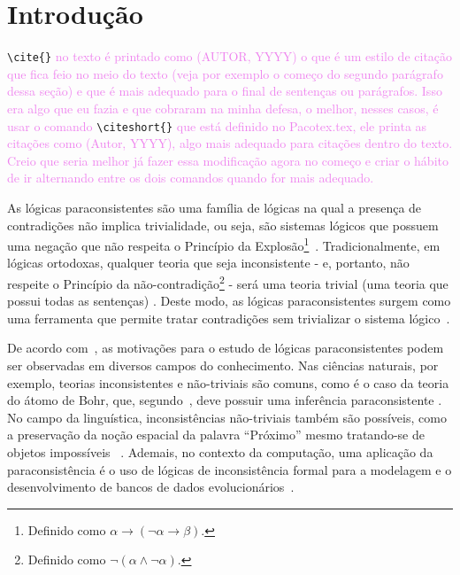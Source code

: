 \chapter{Introdução}
\label{cap:Introducao}

 \verb+\cite{}+ \textcolor{violet}{ no texto é printado como (AUTOR, YYYY) o que é um estilo de citação que fica feio no meio do texto (veja por exemplo o começo do segundo parágrafo dessa seção) e que é mais adequado para o final de sentenças ou parágrafos. Isso era algo que eu fazia e que cobraram na minha defesa, o melhor, nesses casos, é usar o comando} \verb+\citeshort{}+ \textcolor{violet}{ que está definido no Pacotex.tex, ele printa as citações como (Autor, YYYY), algo mais adequado para citações dentro do texto. Creio que seria melhor já fazer essa modificação agora no começo e criar o hábito de ir alternando entre os dois comandos quando for mais adequado.}

\noindent %
As lógicas paraconsistentes são uma família de lógicas na qual a presença de contradições não implica trivialidade, ou seja, são sistemas lógicos que possuem uma negação que não respeita o Princípio da Explosão\footnote{Definido como $\alpha \rightarrow (\neg \alpha \rightarrow \beta)$.}~\cite{carnielli2007}. Tradicionalmente, em lógicas ortodoxas, qualquer teoria que seja inconsistente {-} e, portanto, não respeite o Princípio da não-contradição\footnote{Definido como $\neg (\alpha \land \neg \alpha)$.} {-} será uma teoria trivial (uma teoria que possui todas as sentenças) . Deste modo, as lógicas paraconsistentes surgem como uma ferramenta que permite tratar contradições sem trivializar o sistema lógico~\cite{Carnielli_Coniglio_2016}.

De acordo com~\cite{sep-logic-paraconsistent}, as motivações para o estudo de lógicas paraconsistentes podem ser observadas em diversos campos do conhecimento. Nas ciências naturais, por exemplo, teorias inconsistentes e não-triviais são comuns, como é o caso da teoria do átomo de Bohr, que, segundo~\cite{Brown2015-BROCAP-9}, deve possuir uma inferência paraconsistente . No campo da linguística, inconsistências não-triviais também são possíveis, como a preservação da noção espacial da palavra ``Próximo'' mesmo tratando-se de objetos impossíveis~\cite{McGinnis2013-MCGTUA} . Ademais, no contexto da computação, uma aplicação da paraconsistência é o uso de lógicas de inconsistência formal para a modelagem e o desenvolvimento de bancos de dados evolucionários~\cite{carnielli2000formal}.

